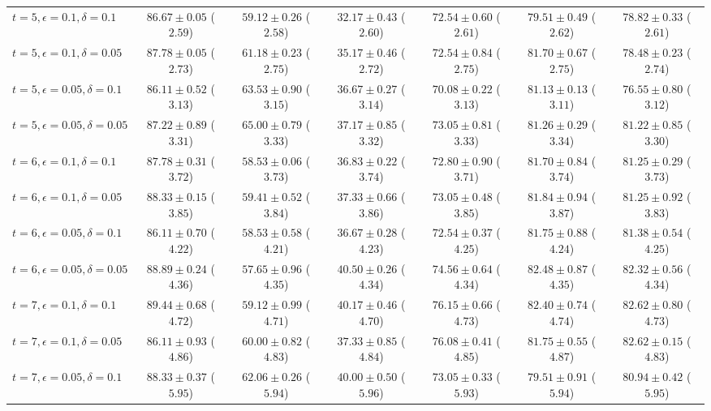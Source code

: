 \documentclass[journal]{IEEEtran}
\theoremstyle{definition}
\begin{document}
\begin{table*}[!t]
\begin{center}
{\begin{tabular}{|l|c|c|c|c|c|c|}
\hline
$t=5, \epsilon = 0.1, \delta = 0.1$   & $86.67 \pm 0.05$ ($2.59$) & $59.12 \pm 0.26$ ($2.58$) & $32.17 \pm 0.43$ ($2.60$) & $72.54 \pm 0.60$ ($2.61$) & $79.51 \pm 0.49$ ($2.62$) & $78.82 \pm 0.33$ ($2.61$) \\
$t=5, \epsilon = 0.1, \delta = 0.05$  & $87.78 \pm 0.05$ ($2.73$) & $61.18 \pm 0.23$ ($2.75$) & $35.17 \pm 0.46$ ($2.72$) & $72.54 \pm 0.84$ ($2.75$) & $81.70 \pm 0.67$ ($2.75$) & $78.48 \pm 0.23$ ($2.74$) \\
$t=5, \epsilon = 0.05, \delta = 0.1$  & $86.11 \pm 0.52$ ($3.13$) & $63.53 \pm 0.90$ ($3.15$) & $36.67 \pm 0.27$ ($3.14$) & $70.08 \pm 0.22$ ($3.13$) & $81.13 \pm 0.13$ ($3.11$) & $76.55 \pm 0.80$ ($3.12$) \\
$t=5, \epsilon = 0.05, \delta = 0.05$ & $87.22 \pm 0.89$ ($3.31$) & $65.00 \pm 0.79$ ($3.33$) & $37.17 \pm 0.85$ ($3.32$) & $73.05 \pm 0.81$ ($3.33$) & $81.26 \pm 0.29$ ($3.34$) & $81.22 \pm 0.85$ ($3.30$) \\
\hline
$t=6, \epsilon = 0.1, \delta = 0.1$   & $87.78 \pm 0.31$ ($3.72$) & $58.53 \pm 0.06$ ($3.73$) & $36.83 \pm 0.22$ ($3.74$) & $72.80 \pm 0.90$ ($3.71$) & $81.70 \pm 0.84$ ($3.74$) & $81.25 \pm 0.29$ ($3.73$) \\
$t=6, \epsilon = 0.1, \delta = 0.05$  & $88.33 \pm 0.15$ ($3.85$) & $59.41 \pm 0.52$ ($3.84$) & $37.33 \pm 0.66$ ($3.86$) & $73.05 \pm 0.48$ ($3.85$) & $81.84 \pm 0.94$ ($3.87$) & $81.25 \pm 0.92$ ($3.83$) \\
$t=6, \epsilon = 0.05, \delta = 0.1$  & $86.11 \pm 0.70$ ($4.22$) & $58.53 \pm 0.58$ ($4.21$) & $36.67 \pm 0.28$ ($4.23$) & $72.54 \pm 0.37$ ($4.25$) & $81.75 \pm 0.88$ ($4.24$) & $81.38 \pm 0.54$ ($4.25$) \\
$t=6, \epsilon = 0.05, \delta = 0.05$ & $88.89 \pm 0.24$ ($4.36$) & $57.65 \pm 0.96$ ($4.35$) & $40.50 \pm 0.26$ ($4.34$) & $74.56 \pm 0.64$ ($4.34$) & $82.48 \pm 0.87$ ($4.35$) & $82.32 \pm 0.56$ ($4.34$) \\
\hline
$t=7, \epsilon = 0.1, \delta = 0.1$   & $89.44 \pm 0.68$ ($4.72$) & $59.12 \pm 0.99$ ($4.71$) & $40.17 \pm 0.46$ ($4.70$) & $76.15 \pm 0.66$ ($4.73$) & $82.40 \pm 0.74$ ($4.74$) & $82.62 \pm 0.80$ ($4.73$) \\
$t=7, \epsilon = 0.1, \delta = 0.05$  & $86.11 \pm 0.93$ ($4.86$) & $60.00 \pm 0.82$ ($4.83$) & $37.33 \pm 0.85$ ($4.84$) & $76.08 \pm 0.41$ ($4.85$) & $81.75 \pm 0.55$ ($4.87$) & $82.62 \pm 0.15$ ($4.83$) \\
$t=7, \epsilon = 0.05, \delta = 0.1$  & $88.33 \pm 0.37$ ($5.95$) & $62.06 \pm 0.26$ ($5.94$) & $40.00 \pm 0.50$ ($5.96$) & $73.05 \pm 0.33$ ($5.93$) & $79.51 \pm 0.91$ ($5.94$) & $80.94 \pm 0.42$ ($5.95$) \\

\end{tabular}}
\end{center}
\end{table*}
\end{document}
